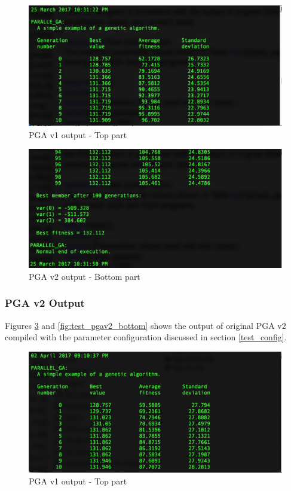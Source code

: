\begin{figure}[!htb]
	\center
        \includegraphics[width= \linewidth]{figs/tests/pga_top.png}
    \caption{PGA v1 output - Top part}
     \label{fig:test_pga_top}
\end{figure}

\begin{figure}[!htb]
	\center
        \includegraphics[width= \linewidth]{figs/tests/pga_bottom.png}
    \caption{PGA v2 output - Bottom part}
     \label{fig:test_pga_bottom}
\end{figure}

\subsubsection{PGA v2 Output}

Figures \ref{fig:test_pgav2_top} and \ref{fig:test_pgav2_bottom} shows the output of original PGA v2 compiled with the parameter configuration discussed in section \ref{test_config}.

\begin{figure}[!htb]
	\center
        \includegraphics[width= \linewidth]{figs/tests/pgav2_top.png}
    \caption{PGA v1 output - Top part}
     \label{fig:test_pgav2_top}
\end{figure}

